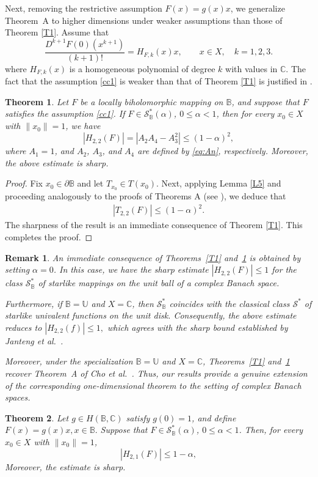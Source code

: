 \documentclass[11pt, reqno]{amsart}
\newtheorem{theo}{Theorem}[section]
\newtheorem{rem}{Remark}[section]
\numberwithin{equation}{section}
\begin{document}
\medskip
Next, removing the restrictive assumption $F(x)=g(x)x$, we generalize Theorem~A to higher dimensions under weaker assumptions than those of Theorem \ref{T1}. Assume that
\begin{equation}\label{cc1}
\frac{D^{k+1}F(0)\left(x^{k+1}\right)}{(k+1)!}
= H_{F,k}(x)x,\qquad x\in X,\quad k=1,2,3.
\end{equation}
where $H_{F,k}(x)$ is a homogeneous polynomial of degree $k$ with values in $\mathbb{C}$. The fact that the assumption \eqref{cc1} is weaker than that of Theorem \ref{T1}  is justified in \cite{H2023}.

\begin{theo}\label{T1.1}
Let $F$ be a locally biholomorphic mapping on $\mathbb{B}$, and suppose that $F$ satisfies the assumption \eqref{cc1}. If $F\in\mathcal{S}^*_\mathbb{B}(\alpha)$, $0\leq \alpha <1$, then for every $x_0\in X$ with $\|x_0\|=1$, we have
\[
|H_{2,2}(F)|=|A_2A_4-A_3^2|\leq (1-\alpha)^2,
\]
 where $A_1=1$, and $A_2$, $A_3$, and $A_4$ are defined by
\eqref{eq:An}, respectively. Moreover, the above estimate is sharp.
\end{theo}
\begin{proof} Fix $x_0\in \partial{\mathbb{B}}$ and let $T_{x_0}\in T(x_0)$. Next, applying Lemma \ref{L5} and proceeding analogously to the proofs of Theorems A  (see \cite[Theorem 2.3]{CKKLS2018}), we deduce that
\begin{align*}
|T_{2,2}(F)|\leq (1-\alpha)^2.
\end{align*}
 The sharpness of the result is an immediate consequence of Theorem \ref{T1}. This completes the proof.\end{proof}
 \begin{rem}
An immediate consequence of Theorems~\ref{T1} and~\ref{T1.1} is obtained by setting $\alpha=0$. In this case, we have the sharp estimate
$|H_{2,2}(F)|\leq 1$
for the class $\mathcal{S}_{\mathbb{B}}^{*}$ of starlike mappings on the unit ball of a complex Banach space.

Furthermore, if $\mathbb{B}=\mathbb{U}$ and $X=\mathbb{C}$, then $\mathcal{S}_{\mathbb{B}}^{*}$ coincides with the classical class $\mathcal{S}^{*}$ of starlike univalent functions on the unit disk. Consequently, the above estimate reduces to $|H_{2,2}(f)|\leq 1,$
which agrees with the sharp bound established by Janteng \emph{et al.}~\cite[Theorem~3.1]{JHD2007}.

Moreover, under the specialization $\mathbb{B}=\mathbb{U}$ and $X=\mathbb{C}$, Theorems~\ref{T1} and~\ref{T1.1} recover Theorem~A of Cho \emph{et al.}~\cite[Theorem~2.5]{CKKLS2018}. Thus, our results provide a genuine extension of the corresponding one-dimensional theorem to the setting of complex Banach spaces.
\end{rem} 
\begin{theo}\label{T2}
Let $g\in H(\mathbb{B},\mathbb{C})$ satisfy $g(0)=1$, and define $F(x)=g(x)x, x\in\mathbb{B}.$
Suppose that $F\in\mathcal{S}^*_\mathbb{B}(\alpha)$, $0\leq \alpha <1$. Then, for every
$x_{0}\in X$ with $\|x_{0}\|=1$,
\[
|H_{2,1}(F)|\leq 1-\alpha,
\]
 Moreover, the estimate is sharp.
\end{theo}
\end{document}
